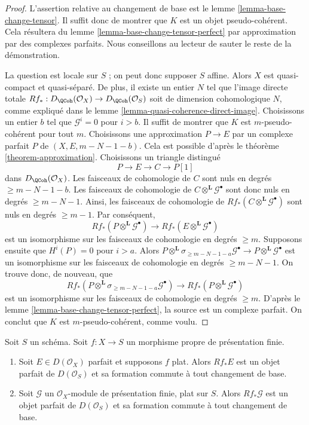 \begin{proof}
L'assertion relative au changement de base est le lemme \ref{lemma-base-change-tensor}.
Il suffit donc de montrer que $K$ est un objet pseudo-cohérent.
Cela résultera du lemme \ref{lemma-base-change-tensor-perfect}
par approximation par des complexes parfaits. Nous conseillons au lecteur de
sauter le reste de la démonstration.

\medskip\noindent
La question est locale sur $S$ ; on peut donc supposer $S$ affine.
Alors $X$ est quasi-compact et quasi-séparé. De plus, il
existe un entier $N$ tel que l'image directe totale
$Rf_* : D_\QCoh(\mathcal{O}_X) \to D_\QCoh(\mathcal{O}_S)$
soit de dimension cohomologique $N$, comme expliqué dans le
lemme \ref{lemma-quasi-coherence-direct-image}.
Choisissons un entier $b$ tel que $\mathcal{G}^i = 0$ pour $i > b$.
Il suffit de montrer que $K$ est $m$-pseudo-cohérent pour
tout $m$. Choisissons une approximation $P \to E$ par un complexe parfait $P$
de $(X, E, m - N - 1 - b)$. Cela est possible d'après le
théorème \ref{theorem-approximation}.
Choisissons un triangle distingué
$$
P \to E \to C \to P[1]
$$
dans $D_\QCoh(\mathcal{O}_X)$. Les faisceaux de cohomologie de $C$ sont nuls
en degrés $\geq m - N - 1 - b$. Les faisceaux de cohomologie de
$C \otimes^\mathbf{L} \mathcal{G}^\bullet$ sont donc nuls en degrés
$\geq m - N - 1$. Ainsi, les faisceaux de cohomologie de
$Rf_*(C \otimes^\mathbf{L} \mathcal{G}^\bullet)$
sont nuls en degrés $\geq m - 1$.
Par conséquent,
$$
Rf_*(P \otimes^\mathbf{L} \mathcal{G}^\bullet) \to
Rf_*(E \otimes^\mathbf{L} \mathcal{G}^\bullet)
$$
est un isomorphisme sur les faisceaux de cohomologie en degrés $\geq m$.
Supposons ensuite que $H^i(P) = 0$ pour $i > a$. Alors
$
P \otimes^\mathbf{L} \sigma_{\geq m - N - 1 - a}\mathcal{G}^\bullet
\longrightarrow
P \otimes^\mathbf{L} \mathcal{G}^\bullet
$
est un isomorphisme sur les faisceaux de cohomologie en degrés $\geq m - N - 1$.
On trouve donc, de nouveau, que
$$
Rf_*(P \otimes^\mathbf{L} \sigma_{\geq m - N - 1 - a}\mathcal{G}^\bullet) \to
Rf_*(P \otimes^\mathbf{L} \mathcal{G}^\bullet)
$$
est un isomorphisme sur les faisceaux de cohomologie en degrés $\geq m$.
D'après le lemme \ref{lemma-base-change-tensor-perfect}, la source
est un complexe parfait.
On conclut que $K$ est $m$-pseudo-cohérent, comme voulu.
\end{proof}

\begin{lemma}
\label{lemma-flat-proper-perfect-direct-image-general}
Soit $S$ un schéma. Soit $f : X \to S$ un morphisme propre
de présentation finie.
\begin{enumerate}
\item Soit $E \in D(\mathcal{O}_X)$ parfait et supposons $f$ plat. Alors
$Rf_*E$ est un objet parfait de $D(\mathcal{O}_S)$ et sa formation
commute à tout changement de base.
\item Soit $\mathcal{G}$ un $\mathcal{O}_X$-module de présentation finie,
plat sur $S$. Alors $Rf_*\mathcal{G}$ est un objet parfait de
$D(\mathcal{O}_S)$ et sa formation commute à tout changement de base.
\end{enumerate}
\end{lemma}

